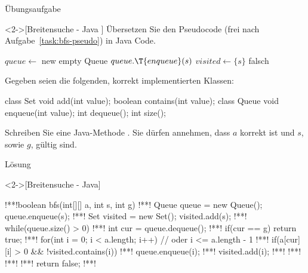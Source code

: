 \begin{frame}[fragile,c]{Übungsaufgabe}
    \begin{exercise}<2->[Breitensuche - Java ]
        \pause{}Übersetzen Sie den Pseudocode (frei nach Aufgabe~\ref{task:bfs-pseudo}) in Java Code.
\par\pause
{}%
%
%
%
%
\begin{minipage}{.5\linewidth}\scriptsize{}\SetAlgoVlined%
\begin{algorithm}[H]
\PreCode\StartCode
\(queue \leftarrow\) new empty Queue\;
\(queue.\T{enqueue}(s)\)\;
\(visited \leftarrow \{s\}\)\;
\KwRet falsch\;
\end{algorithm}\end{minipage}\hfill\begin{minipage}{.465\linewidth}%
    \pause{}Gegeben seien die folgenden, korrekt implementierten Klassen:\pause
\begin{plainjava}
class Set {
  void add(int value);
  boolean contains(int value);
}
class Queue {
  void enqueue(int value);
  int dequeue();
  int size();
}
\end{plainjava}
\end{minipage}\par
Schreiben Sie eine Java-Methode . Sie dürfen annehmen, dass \(a\) korrekt ist und \(s\), sowie \(g\), gültig sind.
    \end{exercise}
\end{frame}

\begin{frame}[fragile,c]{Lösung}
    \begin{solve}<2->[Breitensuche - Java]
\begin{plainjava}[morekeywords={[4]{enqueue,dequeue,contains,add,size}}]
!**!boolean bfs(int[][] a, int s, int g) {
!**!    Queue queue = new Queue(); queue.enqueue(s);
!**!    Set visited = new Set();   visited.add(s);
!**!    while(queue.size() > 0) {
!**!        int cur = queue.dequeue();
!**!        if(cur == g) return true;
!**!        for(int i = 0; i < a.length; i++) { // oder i <= a.length - 1
!**!            if(a[cur][i] > 0 && !visited.contains(i)) {
!**!                queue.enqueue(i);
!**!                visited.add(i);
!**!            }
!**!        }
!**!    }
!**!    return false;
!**!}
\end{plainjava}
    \end{solve}
\end{frame}
\fi
